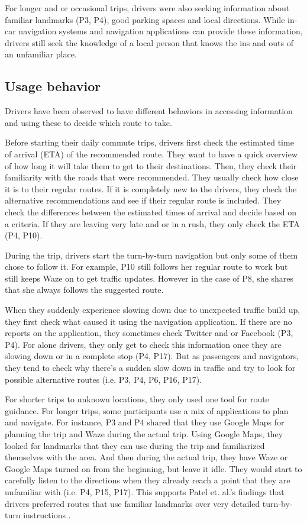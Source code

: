 For longer and or occasional trips, drivers were also seeking information about familiar landmarks (P3, P4), good parking spaces and local directions. While in-car navigation systems and navigation applications can provide these information, drivers still seek the knowledge of a local person that knows the ins and outs of an unfamiliar place. 

\subsection{Usage behavior}
Drivers have been observed to have different behaviors in accessing information and using these to decide which route to take. 

Before starting their daily commute trips, drivers first check the estimated time of arrival (ETA) of the recommended route. They want to have a quick overview of how long it will take them to get to their destinations. Then, they check their familiarity with the roads that were recommended. They usually check how close it is to their regular routes. If it is completely new to the drivers, they check the alternative recommendations and see if their regular route is included. They check the differences between the estimated times of arrival and decide based on a criteria. If they are leaving very late and or in a rush, they only check the ETA (P4, P10). 

During the trip, drivers start the turn-by-turn navigation but only some of them chose to follow it. For example, P10 still follows her regular route to work but still keeps Waze on to get traffic updates. However in the case of P8, she shares that she always follows the suggested route.

When they suddenly experience slowing down due to unexpected traffic build up, they first check what caused it using the navigation application. If there are no reports on the application, they sometimes check Twitter and or Facebook (P3, P4). For alone drivers, they only get to check this information once they are slowing down or in a complete stop (P4, P17). But as passengers and navigators, they tend to check why there's a sudden slow down in traffic and try to look for possible alternative routes (i.e. P3, P4, P6, P16, P17).

For shorter trips to unknown locations, they only used one tool for route guidance. For longer trips, some participants use a mix of applications to plan and navigate. For instance, P3 and P4 shared that they use Google Maps for planning the trip and Waze during the actual trip. Using Google Maps, they looked for landmarks that they can use during the trip and familiarized themselves with the area. And then during the actual trip, they have Waze or Google Maps turned on from the beginning, but leave it idle. They would start to carefully listen to the directions when they already reach a point that they are unfamiliar with (i.e. P4, P15, P17). This supports Patel et. al.'s findings that drivers preferred routes that use familiar landmarks over very detailed turn-by-turn instructions \cite{Patel2006PersonalizingRoutes}. 

